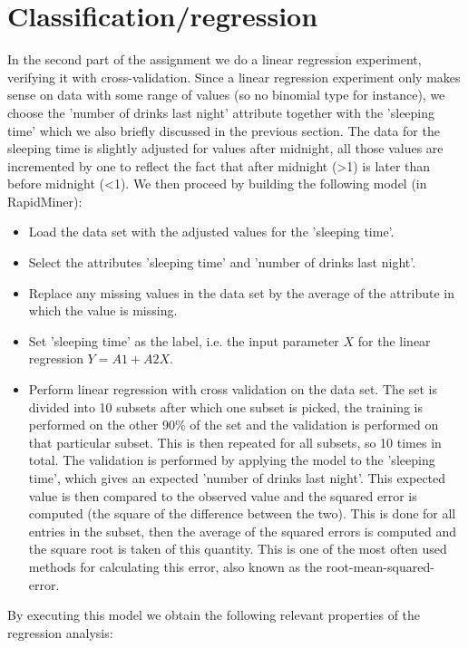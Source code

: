\documentclass[11pt,a4paper,onecolumn]{article}
\begin{document}
\section{Classification/regression}
In the second part of the assignment we do a linear regression experiment, verifying it with cross-validation. Since a linear regression experiment only makes sense on data with some range of values (so no binomial type for instance), we choose the 'number of drinks last night' attribute together with the 'sleeping time' which we also briefly discussed in the previous section. The data for the sleeping time is slightly adjusted for values after midnight, all those values are incremented by one to reflect the fact that after midnight (>1) is later than before midnight (<1). We then proceed by building the following model (in RapidMiner):

\begin{itemize}
\item 
  Load the data set with the adjusted values for the 'sleeping time'.
\item
  Select the attributes 'sleeping time' and 'number of drinks last night'.
\item
  Replace any missing values in the data set by the average of the attribute in which the value is missing.
\item
  Set 'sleeping time' as the label, i.e. the input parameter $X$ for the linear regression $Y = A1 + A2 X$.
\item
  Perform linear regression with cross validation on the data set. The set is divided into 10 subsets after which one subset is picked, the training is performed on the other 90\% of the set and the validation is performed on that particular subset. This is then repeated for all subsets, so 10 times in total. The validation is performed by applying the model to the 'sleeping time', which gives an expected 'number of drinks last night'. This expected value is then compared to the observed value and the squared error is computed (the square of the difference between the two). This is done for all entries in the subset, then the average of the squared errors is computed and the square root is taken of this quantity. This is one of the most often used methods for calculating this error, also known as the root-mean-squared-error.
\end{itemize}

By executing this model we obtain the following relevant properties of the regression analysis:
\end{document}

